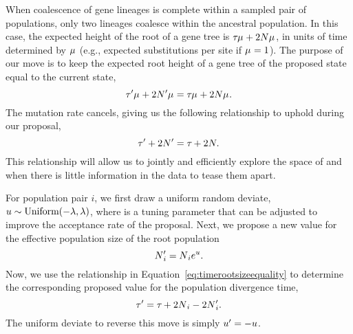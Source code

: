 When coalescence of gene lineages is complete within a sampled pair of
populations, only two lineages coalesce within the ancestral population.
In this case, the expected height of the root of a gene tree is
$\divtime\murate + 2\sepopsize[\rootpopindex]\murate$,
in units of time determined by $\murate$ (e.g., expected substitutions per site
if $\murate = 1$).
The purpose of our move is to keep the expected root height of a gene tree
of the proposed state equal to the current state,
\begin{equation}
    \divtime\proposed\murate + 2\sepopsize[\rootpopindex]{}\proposed\murate =
    \divtime\murate + 2\sepopsize[\rootpopindex]\murate.
\end{equation}
The mutation rate cancels, giving us the following relationship to uphold
during our proposal,
\begin{equation}
    \divtime\proposed + 2\sepopsize[\rootpopindex]{}\proposed =
    \divtime + 2\sepopsize[\rootpopindex].
    \label{eq:timerootsizeequality}
\end{equation}
This relationship will allow us to jointly and efficiently explore the space of
\divtime and \sepopsize[\rootpopindex] when there is little information in the
data to tease them apart.

For population pair $i$, we first draw a uniform random deviate,
$\uniformdeviate \sim \textrm{Uniform}(-\tuningparameter, \tuningparameter)$,
where \tuningparameter is a tuning parameter that can be adjusted to 
improve the acceptance rate of the proposal.
Next, we propose a new value for the effective population size of the
root population
\[
    \sepopsize[\rootpopindex]{}_i\proposed = \sepopsize[\rootpopindex]{}_ie^{\uniformdeviate}.
\]
Now, we use the relationship in Equation~\ref{eq:timerootsizeequality} to
determine the corresponding proposed value for the population divergence time,
\begin{equation}
    \divtime\proposed =
    \divtime + 2\sepopsize[\rootpopindex]{}_i - 2\sepopsize[\rootpopindex]{}_i\proposed.
\end{equation}
The uniform deviate to reverse this move is simply
$\uniformdeviate\proposed = -\uniformdeviate$.


